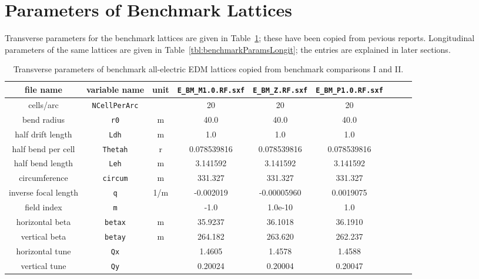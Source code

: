 \documentclass[]{article}
\begin{document}
\clearpage

\section{Parameters of Benchmark Lattices}
Transverse parameters for the benchmark lattices are given in 
Table~\ref{tbl:benchmarkParamsTransv}; these have been copied from
pevious reports. Longitudinal parameters of the same
lattices are given in Table~\ref{tbl:benchmarkParamsLongit}; the
entries are explained in later sections.
%
\begin{table}[h]
\caption{\label{tbl:benchmarkParamsTransv}Transverse parameters of benchmark all-electric 
EDM lattices copied from benchmark comparisons
I\cite{BenchmarkI} and II\cite{BenchmarkII}. 
} 
\medskip
\centering
\begin{tabular}{|c|c|c|c|c|c|c|c|c|}           \hline
file name         & variable name     & unit & {\tt E\_BM\_M1.0.RF.sxf} & {\tt E\_BM\_Z.RF.sxf} & {\tt E\_BM\_P1.0.RF.sxf} \\ \hline
cells/arc         & {\tt NCellPerArc} &      &      20               &       20           &        20             \\
bend radius       &  {\tt r0}         &  m   &     40.0              &      40.0          &       40.0            \\
half drift length &  {\tt Ldh}        &  m   &      1.0              &     1.0            &        1.0            \\
half bend per cell & {\tt Thetah}     &  r   &   0.078539816         &  0.078539816       &  0.078539816          \\
half bend length  & {\tt Leh}         &  m   &    3.141592           &  3.141592          &   3.141592            \\
circumference     & {\tt circum}      &  m   &   331.327             &   331.327          &    331.327            \\ \hline
inverse focal length &  {\tt q}       & 1/m  &    -0.002019          & -0.00005960        &     0.0019075         \\
field index       &  {\tt m}          &      &     -1.0              &  1.0e-10           &         1.0            \\ \hline
horizontal beta  & {\tt betax}        &  m   &    35.9237            &  36.1018           &     36.1910            \\
vertical beta     & {\tt betay}       &  m   &   264.182             &  263.620           &     262.237            \\ \hline
horizontal tune  &  {\tt Qx}          &      &     1.4605            &   1.4578           &      1.4588            \\
vertical tune     &  {\tt Qy}         &      &     0.20024           &   0.20004          &     0.20047            \\ 
\hline
\end{tabular}
\end{table}
\end{document}
